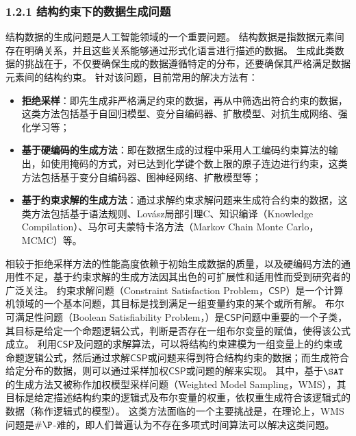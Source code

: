 \documentclass[12pt,UTF8,AutoFakeBold=3,a4paper]{ctexart} %
\newcommand{\CSP}{\ensuremath{\mathsf{CSP}}}
\begin{document}
\subsubsection{1.2.1 结构约束下的数据生成问题}

结构数据的生成问题是人工智能领域的一个重要问题。
结构数据是指数据元素间存在明确关系，并且这些关系能够通过形式化语言进行描述的数据。
生成此类数据的挑战在于，不仅要确保生成的数据遵循特定的分布，还要确保其严格满足数据元素间的结构约束。
针对该问题，目前常用的解决方法有：
\begin{itemize}
	\item \textbf{拒绝采样}：即先生成非严格满足约束的数据，再从中筛选出符合约束的数据，这类方法包括基于自回归模型、变分自编码器、扩散模型、对抗生成网络、强化学习等；
	\item \textbf{基于硬编码的生成方法}：即在数据生成的过程中采用人工编码约束算法的输出，如使用掩码的方式，对已达到化学键个数上限的原子连边进行约束，这类方法包括基于变分自编码器、图神经网络、扩散模型等；
	\item \textbf{基于约束求解的生成方法}：通过求解约束求解问题来生成符合约束的数据，这类方法包括基于语法规则、Lovász局部引理C、知识编译（Knowledge Compilation）、马尔可夫蒙特卡洛方法（Markov Chain Monte Carlo，MCMC）等。
\end{itemize}
相较于拒绝采样方法的性能高度依赖于初始生成数据的质量，以及硬编码方法的通用性不足，基于约束求解的生成方法因其出色的可扩展性和适用性而受到研究者的广泛关注。
约束求解问题（Constraint Satisfaction Problem，\CSP{}）是一个计算机领域的一个基本问题，其目标是找到满足一组变量约束的某个或所有解。
布尔可满足性问题（Boolean Satisfiability Problem，\SAT）是\CSP{}问题中重要的一个子类，其目标是给定一个命题逻辑公式，判断是否存在一组布尔变量的赋值，使得该公式成立。
利用\CSP{}及\SAT{}问题的求解算法，可以将结构约束建模为一组变量上的约束或命题逻辑公式，然后通过求解\CSP{}或\SAT{}问题来得到符合结构约束的数据；而生成符合给定分布的数据，则可以通过采样加权\CSP{}或\SAT{}问题的解来实现。
其中，基于$\SAT$的生成方法又被称作加权模型采样问题（Weighted Model Sampling，WMS），其目标是给定描述结构约束的逻辑式及布尔变量的权重，依权重生成符合该逻辑式的数据（称作逻辑式的模型）。
这类方法面临的一个主要挑战是，在理论上，WMS问题是$\#\P$-难的，即人们普遍认为不存在多项式时间算法可以解决这类问题。
\end{document}

